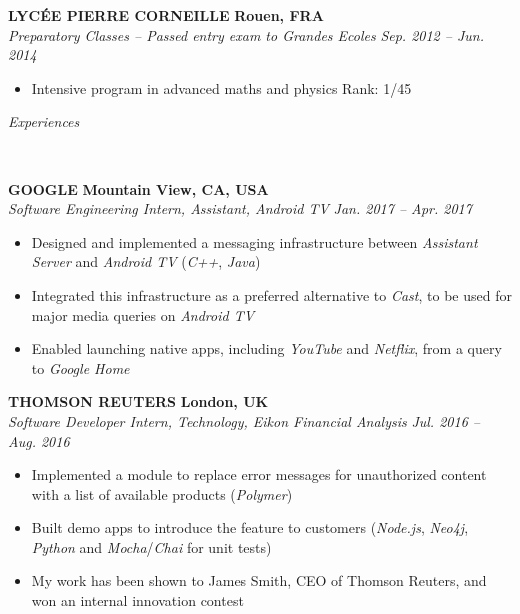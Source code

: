 \documentclass[a4paper, 12pt]{article}
\newcommand{\marginline}{-0.3cm}
\newcommand{\margincontent}{-0.6cm}
\newcommand{\marginbeforesection}{0.35cm}
\newcommand{\linewidthperso}{0.02cm}
\newcommand{\styletitle}[1]{\textbf{#1}}
\newcommand{\styledesc}[1]{\textit{#1}}
\newcommand{\styleloc}[1]{\textbf{#1}}
\newcommand{\styledates}[1]{\textit{#1}}
\newcommand{\stylesection}[1]{
  \vspace{\marginbeforesection}
  \begin{normalsize}\textit{#1}\end{normalsize}
  \vspace{\marginline}\\
  \noindent\makebox[\linewidth]{\rule{\textwidth}{\linewidthperso}}

}
\begin{document}
\begin{footnotesize}
\styletitle{LYC\'EE PIERRE CORNEILLE} \hfill \styleloc{Rouen, FRA}\\
\styledesc{Preparatory Classes -- Passed entry exam to Grandes Ecoles} \hfill \styledates{Sep. 2012 -- Jun. 2014}\\
\vspace{\margincontent}
\begin{itemize}
  \item Intensive program in advanced maths and physics \hfill Rank: 1/45
\end{itemize}

\stylesection{Experiences}

\styletitle{GOOGLE} \hfill \styleloc{Mountain View, CA, USA}\\ 
\styledesc{Software Engineering Intern, Assistant, Android TV} \hfill \styledates{Jan. 2017 -- Apr. 2017}\\
\vspace{\margincontent}
\begin{itemize}
  \item Designed and implemented a messaging infrastructure between \textit{Assistant Server} and \textit{Android TV} (\textit{C++}, \textit{Java})
  \item Integrated this infrastructure as a preferred alternative to \textit{Cast}, to be used for major media queries on \textit{Android TV}
  \item Enabled launching native apps, including \textit{YouTube} and \textit{Netflix}, from a query to \textit{Google Home}
\end{itemize}

\styletitle{THOMSON REUTERS} \hfill \styleloc{London, UK}\\ 
\styledesc{Software Developer Intern, Technology, Eikon Financial Analysis} \hfill \styledates{Jul. 2016 -- Aug. 2016}\\
\vspace{\margincontent}
\begin{itemize}
  \item Implemented a module to replace error messages for unauthorized content with a list of available products (\textit{Polymer})
  \item Built demo apps to introduce the feature to customers (\textit{Node.js}, \textit{Neo4j}, \textit{Python} and \textit{Mocha}/\textit{Chai} for unit tests)
  \item My work has been shown to James Smith, CEO of Thomson Reuters, and won an internal innovation contest
\end{itemize}


\end{footnotesize}
\end{document}
